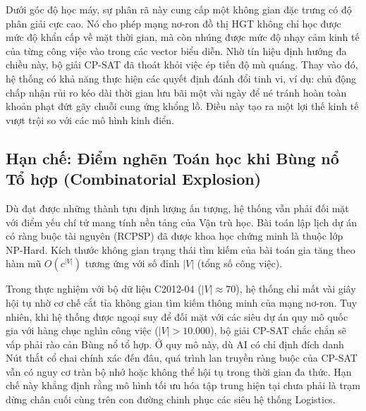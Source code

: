 Dưới góc độ học máy, sự phân rã này cung cấp một không gian đặc trưng có độ phân giải cực cao. Nó cho phép mạng nơ-ron đồ thị HGT không chỉ học được mức độ khẩn cấp về mặt thời gian, mà còn nhúng được mức độ nhạy cảm kinh tế của từng công việc vào trong các vector biểu diễn. Nhờ tín hiệu định hướng đa chiều này, bộ giải CP-SAT đã thoát khỏi việc ép tiến độ mù quáng. Thay vào đó, hệ thống có khả năng thực hiện các quyết định đánh đổi tinh vi, ví dụ: chủ động chấp nhận rủi ro kéo dài thời gian lưu bãi một vài ngày để né tránh hoàn toàn khoản phạt đứt gãy chuỗi cung ứng khổng lồ. Điều này tạo ra một lợi thế kinh tế vượt trội so với các mô hình kinh điển.

\subsection{Hạn chế: Điểm nghẽn Toán học khi Bùng nổ Tổ hợp (Combinatorial Explosion)}
\label{sec:3.6.2_han_che_cpsat}

Dù đạt được những thành tựu định lượng ấn tượng, hệ thống vẫn phải đối mặt với điểm yếu chí tử mang tính nền tảng của Vận trù học. Bài toán lập lịch dự án có ràng buộc tài nguyên (RCPSP) đã được khoa học chứng minh là thuộc lớp NP-Hard. Kích thước không gian trạng thái tìm kiếm của bài toán gia tăng theo hàm mũ $O(c^{|V|})$ tương ứng với số đỉnh $|V|$ (tổng số công việc).

Trong thực nghiệm với bộ dữ liệu C2012-04 ($|V| \approx 70$), hệ thống chỉ mất vài giây hội tụ nhờ cơ chế cắt tỉa không gian tìm kiếm thông minh của mạng nơ-ron. Tuy nhiên, khi hệ thống được ngoại suy để đối mặt với các siêu dự án quy mô quốc gia với hàng chục nghìn công việc ($|V| > 10.000$), bộ giải CP-SAT chắc chắn sẽ vấp phải rào cản Bùng nổ tổ hợp. Ở quy mô này, dù AI có chỉ định đích danh Nút thắt cổ chai chính xác đến đâu, quá trình lan truyền ràng buộc của CP-SAT vẫn có nguy cơ tràn bộ nhớ hoặc không thể hội tụ trong thời gian đa thức. Hạn chế này khẳng định rằng mô hình tối ưu hóa tập trung hiện tại chưa phải là trạm dừng chân cuối cùng trên con đường chinh phục các siêu hệ thống Logistics.
